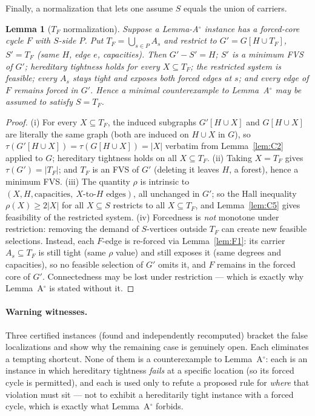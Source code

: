 \documentclass[11pt]{article}
\theoremstyle{plain}
\newtheorem{lemma}[theorem]{Lemma}
\theoremstyle{definition}
\newcommand{\FVS}{\tau}
\begin{document}
Finally, a normalization that lets one assume $S$ equals the union of carriers.

\begin{lemma}[$T_F$ normalization]\label{lem:TF}
Suppose a Lemma-A$^{\circ}$ instance has a forced-core cycle $F$ with $S$-side
$P$. Put $T_F=\bigcup_{s\in P}A_s$ and restrict to $G'=G[H\cup T_F]$, $S'=T_F$
(same $H$, edge $e$, capacities). Then $G'-S'=H$; $S'$ is a minimum FVS of $G'$;
hereditary tightness holds for every $X\subseteq T_F$; the restricted system is
feasible; every $A_s$ stays tight and exposes both forced edges at $s$; and every
edge of $F$ remains forced in $G'$. Hence a minimal counterexample to
Lemma~A$^{\circ}$ may be assumed to satisfy $S=T_F$.
\end{lemma}

\begin{proof}
(i) For every $X\subseteq T_F$, the induced subgraphs $G'[H\cup X]$ and
$G[H\cup X]$ are literally the same graph (both are induced on $H\cup X$ in $G$),
so $\FVS(G'[H\cup X])=\FVS(G[H\cup X])=|X|$ verbatim from Lemma~\ref{lem:C2}
applied to $G$; hereditary tightness holds on all $X\subseteq T_F$.
(ii) Taking $X=T_F$ gives $\FVS(G')=|T_F|$; and $T_F$ is an FVS of $G'$ (deleting
it leaves $H$, a forest), hence a minimum FVS.
(iii) The quantity $\rho$ is intrinsic to $(X,H,\text{capacities},\ X\text{-to-}
H\text{ edges})$, all unchanged in $G'$; so the Hall inequality $\rho(X)\ge2|X|$
for all $X\subseteq S$ restricts to all $X\subseteq T_F$, and Lemma~\ref{lem:C5}
gives feasibility of the restricted system.
(iv) Forcedness is \emph{not} monotone under restriction: removing the demand of
$S$-vertices outside $T_F$ can create new feasible selections. Instead, each
$F$-edge is re-forced via Lemma~\ref{lem:F1}: its carrier $A_s\subseteq T_F$ is
still tight (same $\rho$ value) and still exposes it (same degrees and
capacities), so no feasible selection of $G'$ omits it, and $F$ remains in the
forced core of $G'$.
Connectedness may be lost under restriction --- which is exactly why
Lemma~A$^{\circ}$ is stated without it.
\end{proof}

\paragraph{Warning witnesses.} Three certified instances (found and independently
recomputed) bracket the false localizations and show why the remaining case is
genuinely open. Each eliminates a tempting shortcut. None of them is a
counterexample to Lemma~A$^{\circ}$: each is an instance in which hereditary
tightness \emph{fails} at a specific location (so its forced cycle is permitted),
and each is used only to refute a proposed rule for \emph{where} that violation
must sit --- not to exhibit a hereditarily tight instance with a forced cycle,
which is exactly what Lemma~A$^{\circ}$ forbids.
\end{document}
